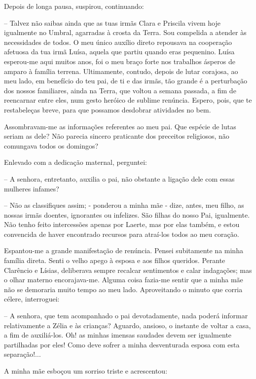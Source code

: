 \documentclass[portuguese,12pt,a4paper]{scrbook}
\begin{document}
	Depois de longa pausa, suspirou, continuando:
	
	– Talvez não saibas ainda que as tuas irmãs Clara e Priscila vivem hoje igualmente no Umbral, agarradas à crosta da Terra. Sou compelida a atender às necessidades de todos. O meu único auxílio direto repousava na cooperação afetuosa da tua irmã Luísa, aquela que partiu quando eras pequenino. Luísa esperou-me aqui muitos anos, foi o meu braço forte nos trabalhos ásperos de amparo à família terrena. Ultimamente, contudo, depois de lutar corajosa, ao meu lado, em benefício do teu pai, de ti e das irmãs, tão grande é a perturbação dos nossos familiares, ainda na Terra, que voltou a semana passada, a fim de reencarnar entre eles, num gesto heróico de sublime renúncia. Espero, pois, que te restabeleças breve, para que possamos desdobrar atividades no bem.
	
	Assombravam-me as informações referentes ao meu pai. Que espécie de lutas seriam as dele? Não parecia sincero praticante dos preceitos religiosos, não comungava todos os domingos?
	
	Enlevado com a dedicação maternal, perguntei:
	
	– A senhora, entretanto, auxilia o pai, não obstante a ligação dele com essas mulheres infames?
	
	– Não as classifiques assim; - ponderou a minha mãe - dize, antes, meu filho, as nossas irmãs doentes, ignorantes ou infelizes. São filhas do nosso Pai, igualmente. Não tenho feito intercessões apenas por Laerte, mas por elas também, e estou convencida de haver encontrado recursos para atraí-los todos ao meu coração.
	
	
	Espantou-me a grande manifestação de renúncia. Pensei subitamente na minha família direta. Senti o velho apego à esposa e aos filhos queridos. Perante Clarêncio e Lísias, deliberava sempre recalcar sentimentos e calar indagações; mas o olhar materno encorajava-me. Alguma coisa fazia-me sentir que a minha mãe não se demoraria muito tempo ao meu lado. Aproveitando o minuto que corria célere, interroguei:
	
	– A senhora, que tem acompanhado o pai devotadamente, nada poderá informar relativamente a Zélia e às crianças? Aguardo, ansioso, o instante de voltar a casa, a fim de auxiliá-los. Oh! as minhas imensas saudades devem ser igualmente partilhadas por eles! Como deve sofrer a minha desventurada esposa com esta separação!...
	
	A minha mãe esboçou um sorriso triste e acrescentou:
	
\end{document}
